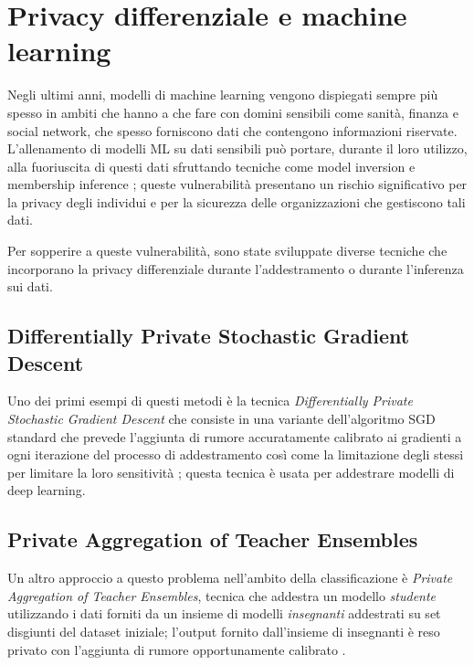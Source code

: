 \section{Privacy differenziale e machine learning}
Negli ultimi anni, modelli di machine learning vengono dispiegati sempre più spesso in ambiti che hanno a che fare con domini sensibili come sanità, finanza e social network, che spesso forniscono dati che contengono informazioni riservate. L'allenamento di modelli ML su dati sensibili può portare, durante il loro utilizzo, alla fuoriuscita di questi dati \cite{Zhang_2023mlprivacy} sfruttando tecniche come model inversion \cite{OWASPmlinversion:online} e membership inference \cite{OWASPmembinference:online}; queste vulnerabilità presentano un rischio significativo per la privacy degli individui e per la sicurezza delle organizzazioni che gestiscono tali dati.

Per sopperire a queste vulnerabilità, sono state sviluppate diverse tecniche che incorporano la privacy differenziale durante l'addestramento o durante l'inferenza sui dati.

\subsection{Differentially Private Stochastic Gradient Descent}

Uno dei primi esempi di questi metodi è la tecnica \textit{Differentially Private Stochastic Gradient Descent} che consiste in una variante dell'algoritmo SGD standard che prevede l'aggiunta di rumore accuratamente calibrato ai gradienti a ogni iterazione del processo di addestramento così come la limitazione degli stessi per limitare la loro sensitività \cite{Abadi_2016dpsgd}; questa tecnica è usata per addestrare modelli di deep learning.

\subsection{Private Aggregation of Teacher Ensembles}

Un altro approccio a questo problema nell'ambito della classificazione è \textit{Private Aggregation of Teacher Ensembles}, tecnica che addestra un modello \textit{studente} utilizzando i dati forniti da un insieme di modelli \textit{insegnanti} addestrati su set disgiunti del dataset iniziale; l'output fornito dall'insieme di insegnanti è reso privato con l'aggiunta di rumore opportunamente calibrato \cite{papernot2018scalableprivatelearningpate}.

